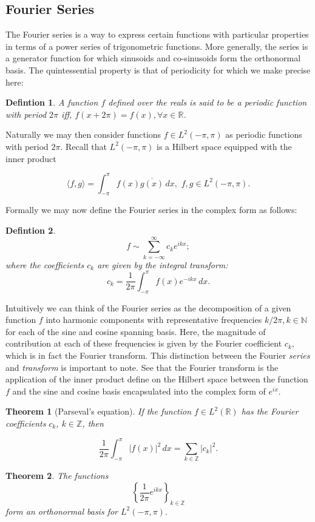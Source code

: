 \documentclass{article}
\newtheorem{defn}{Defintion}[section]
\newtheorem{thm}{Theorem}[section]
\begin{document}
\subsection{Fourier Series}

The Fourier series is a way to express certain functions with particular
properties in terms of a power series of trigonometric functions. More
generally, the series is a generator function for which sinusoids and
co-sinusoids form the orthonormal basis. The quintessential property is that of
periodicity for which we make precise here:

\begin{defn}
  A function $f$ defined over the reals is said to be a \emph{periodic
  function} with period $2\pi$ iff, $f(x + 2\pi) = f(x), \forall x \in \mathbb{R}$.
\end{defn}

Naturally we may then consider functions $f \in L^2(-\pi,\pi)$ as periodic
functions with period $2\pi$. Recall that $L^2(-\pi,\pi)$ is a Hilbert space
equipped with the inner product

\[
  \langle f,g \rangle = \int_{-\pi}^{\pi} f(x) \overline{g(x)} \, dx,
  \,\, f,g \in L^2(-\pi,\pi).
\]

Formally we may now define the Fourier series in the complex form as follows:

\begin{defn}
  \[
    f \sim \sum_{k=-\infty}^{\infty} c_k e^{ikx};
  \]
  where the coefficients $c_k$ are given by the integral transform:
  \[
    c_k = \frac{1}{2\pi} \int_{-\pi}^{\pi} f(x) e^{-ikx} \, dx.
  \]
\end{defn}

Intuitively we can think of the Fourier series as the decomposition of a given
function $f$ into harmonic components with representative frequencies $k/2\pi,
k\in\mathbb{N}$ for each of the sine and cosine spanning basis. Here, the
magnitude of contribution at each of these frequencies is given by the Fourier
coefficient $c_k$, which is in fact the Fourier transform. This distinction
between the Fourier \emph{series} and \emph{transform} is important to note.
See that the Fourier transform is the application of the inner product define
on the Hilbert space between the function $f$ and the sine and cosine basis
encapsulated into the complex form of $e^{ix}$.

\begin{thm}[Parseval's equation]
  If the function $f \in L^2(\mathbb{R})$ has the Fourier coefficients $c_k$,
  $k \in \mathbb{Z}$, then

  \[
    \frac{1}{2\pi} \int_{-\pi}^{\pi} | f(x) |^2 \, dx
    = \sum_{k \in \mathbb{Z}} | c_k |^2.
  \]
\end{thm}

\begin{thm}
  The functions
  \[
    \left\{ \frac{1}{2\pi} e^{ikx} \right\}_{k \in \mathbb{Z}}
  \]
  form an orthonormal basis for $L^2(-\pi,\pi)$.
\end{thm}
\end{document}
